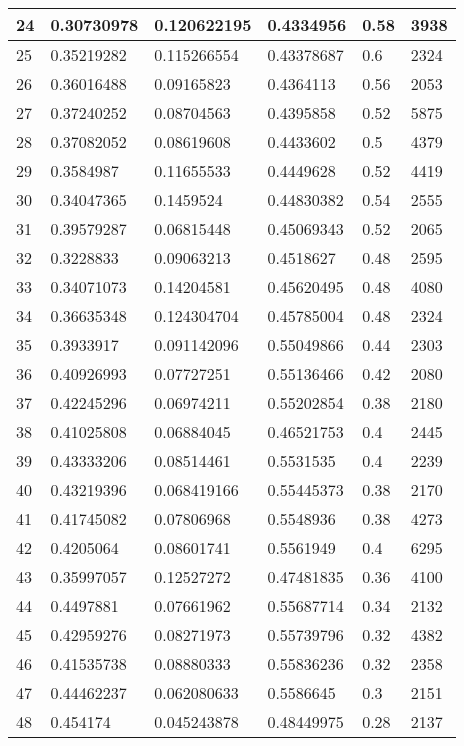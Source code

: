 \begin{longtable}{|l|l|l|l|l|l|}
24 & 0.30730978 & 0.120622195 & 0.4334956 & 0.58 & 3938 \\ \hline 
25 & 0.35219282 & 0.115266554 & 0.43378687 & 0.6 & 2324 \\ \hline 
26 & 0.36016488 & 0.09165823 & 0.4364113 & 0.56 & 2053 \\ \hline 
27 & 0.37240252 & 0.08704563 & 0.4395858 & 0.52 & 5875 \\ \hline 
28 & 0.37082052 & 0.08619608 & 0.4433602 & 0.5 & 4379 \\ \hline 
29 & 0.3584987 & 0.11655533 & 0.4449628 & 0.52 & 4419 \\ \hline 
30 & 0.34047365 & 0.1459524 & 0.44830382 & 0.54 & 2555 \\ \hline 
31 & 0.39579287 & 0.06815448 & 0.45069343 & 0.52 & 2065 \\ \hline 
32 & 0.3228833 & 0.09063213 & 0.4518627 & 0.48 & 2595 \\ \hline 
33 & 0.34071073 & 0.14204581 & 0.45620495 & 0.48 & 4080 \\ \hline 
34 & 0.36635348 & 0.124304704 & 0.45785004 & 0.48 & 2324 \\ \hline 
35 & 0.3933917 & 0.091142096 & 0.55049866 & 0.44 & 2303 \\ \hline 
36 & 0.40926993 & 0.07727251 & 0.55136466 & 0.42 & 2080 \\ \hline 
37 & 0.42245296 & 0.06974211 & 0.55202854 & 0.38 & 2180 \\ \hline 
38 & 0.41025808 & 0.06884045 & 0.46521753 & 0.4 & 2445 \\ \hline 
39 & 0.43333206 & 0.08514461 & 0.5531535 & 0.4 & 2239 \\ \hline 
40 & 0.43219396 & 0.068419166 & 0.55445373 & 0.38 & 2170 \\ \hline 
41 & 0.41745082 & 0.07806968 & 0.5548936 & 0.38 & 4273 \\ \hline 
42 & 0.4205064 & 0.08601741 & 0.5561949 & 0.4 & 6295 \\ \hline 
43 & 0.35997057 & 0.12527272 & 0.47481835 & 0.36 & 4100 \\ \hline 
44 & 0.4497881 & 0.07661962 & 0.55687714 & 0.34 & 2132 \\ \hline 
45 & 0.42959276 & 0.08271973 & 0.55739796 & 0.32 & 4382 \\ \hline 
46 & 0.41535738 & 0.08880333 & 0.55836236 & 0.32 & 2358 \\ \hline 
47 & 0.44462237 & 0.062080633 & 0.5586645 & 0.3 & 2151 \\ \hline 
48 & 0.454174 & 0.045243878 & 0.48449975 & 0.28 & 2137 \\ \hline 

\end{longtable}
